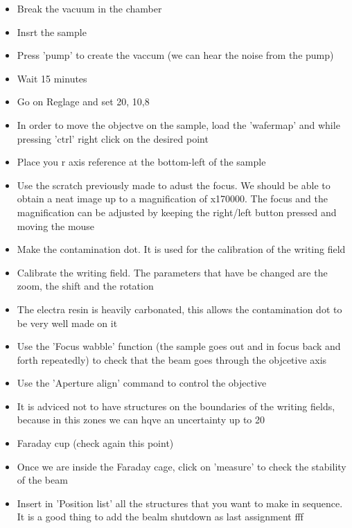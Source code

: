 \documentclass[a4paper]{article}
\begin{document}
\begin{itemize}
  \item Break the vacuum in the chamber
  \item Insrt the sample
  \item Press 'pump' to create the vaccum (we can hear the noise from the pump)
  \item Wait 15 minutes
  \item Go on Reglage and set \unit{20}{\kilo\volt}, \unit{10}{\micro\metre},\unit{8}{\milli\metre}
  \item In order to move the objectve on the sample, load the 'wafermap' and while pressing 'ctrl' right click on the desired point
  \item Place you r axis reference at the bottom-left of the sample
  \item Use the scratch previously made to adust the focus. We should be able to obtain a neat image up to a magnification of x170000. The focus and the magnification can be adjusted by keeping the right/left button pressed and moving the mouse
  \item Make the contamination dot. It is used for the calibration of the writing field
  \item Calibrate the writing field. The parameters that have be changed are the zoom, the shift and the rotation
  \item The electra resin is heavily carbonated, this allows the contamination dot to be very well made on it
  \item Use the 'Focus wabble' function (the sample goes out and in focus back and forth repeatedly) to check that the beam goes through the objcetive axis
  \item Use the 'Aperture align' command to control the objective
  \item It is adviced not to have structures on the boundaries of the writing fields, because in this zones we can hqve an uncertainty up to \unit{20}{\nano\metre}
  \item Faraday cup (check again this point)
  \item Once we are inside the Faraday cage, click on 'measure' to check the stability of the beam
  \item Insert in 'Position list' all the structures that you want to make in sequence. It is a good thing to add the bealm shutdown as last assignment
fff

\end{itemize}

 
\end{document}
